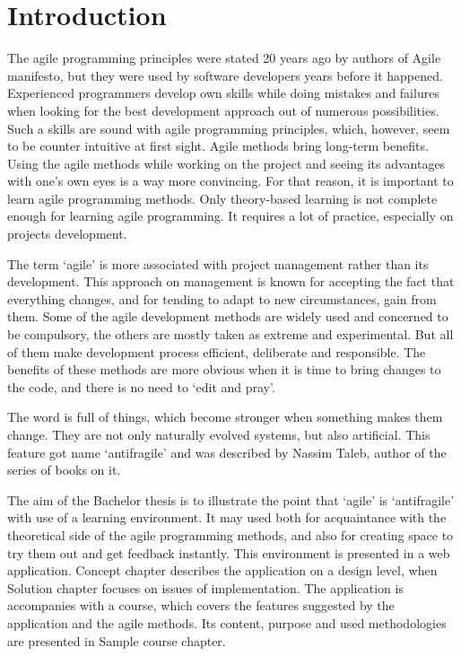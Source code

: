 \chapter*{Introduction} %

The agile programming principles were stated 20 years ago by authors of Agile manifesto, but they were used by software developers years before it happened. Experienced programmers develop own skills while doing mistakes and failures when looking for the best development approach out of numerous possibilities. Such a skills are sound with agile programming principles, which, however, seem to be counter intuitive at first sight. Agile methods bring long-term benefits. Using the agile methods while working on the project and seeing its advantages with one's own eyes is a way more convincing. For that reason, it is important to learn agile programming methods. Only theory-based learning is not complete enough for learning agile programming. It requires a lot of practice, especially on projects development.

The term `agile' is more associated with project management rather than its development. This approach on management is known for accepting the fact that everything changes, and for tending to adapt to new circumstances, gain from them. Some of the agile development methods are widely used and concerned to be compulsory, the others are mostly taken as extreme and experimental. But all of them make development process efficient, deliberate and responsible. The benefits of these methods are more obvious when it is time to bring changes to the code, and there is no need to `edit and pray'.

The word is full of things, which become stronger when something makes them change. They are not only naturally evolved systems, but also artificial. This feature got name `antifragile' and was described by Nassim Taleb, author of the series of books on it.

The aim of the Bachelor thesis is to illustrate the point that `agile' is `antifragile' with use of a learning environment. It may used both for acquaintance with the theoretical side of the agile programming methods, and also for creating space to try them out and get feedback instantly. This environment is presented in a web application. Concept chapter describes the application on a design level, when Solution chapter focuses on issues of implementation. The application is accompanies with a course, which covers the features suggested by the application and the agile methods. Its content, purpose and used methodologies are presented in Sample course chapter.
